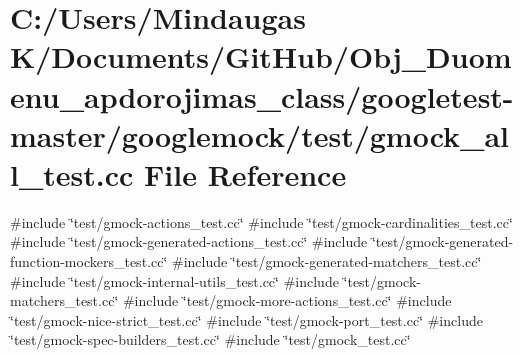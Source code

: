 \hypertarget{googletest-master_2googlemock_2test_2gmock__all__test_8cc}{}\section{C\+:/\+Users/\+Mindaugas K/\+Documents/\+Git\+Hub/\+Obj\+\_\+\+Duomenu\+\_\+apdorojimas\+\_\+class/googletest-\/master/googlemock/test/gmock\+\_\+all\+\_\+test.cc File Reference}
\label{googletest-master_2googlemock_2test_2gmock__all__test_8cc}
{\ttfamily \#include \char`\"{}test/gmock-\/actions\+\_\+test.\+cc\char`\"{}}\newline
{\ttfamily \#include \char`\"{}test/gmock-\/cardinalities\+\_\+test.\+cc\char`\"{}}\newline
{\ttfamily \#include \char`\"{}test/gmock-\/generated-\/actions\+\_\+test.\+cc\char`\"{}}\newline
{\ttfamily \#include \char`\"{}test/gmock-\/generated-\/function-\/mockers\+\_\+test.\+cc\char`\"{}}\newline
{\ttfamily \#include \char`\"{}test/gmock-\/generated-\/matchers\+\_\+test.\+cc\char`\"{}}\newline
{\ttfamily \#include \char`\"{}test/gmock-\/internal-\/utils\+\_\+test.\+cc\char`\"{}}\newline
{\ttfamily \#include \char`\"{}test/gmock-\/matchers\+\_\+test.\+cc\char`\"{}}\newline
{\ttfamily \#include \char`\"{}test/gmock-\/more-\/actions\+\_\+test.\+cc\char`\"{}}\newline
{\ttfamily \#include \char`\"{}test/gmock-\/nice-\/strict\+\_\+test.\+cc\char`\"{}}\newline
{\ttfamily \#include \char`\"{}test/gmock-\/port\+\_\+test.\+cc\char`\"{}}\newline
{\ttfamily \#include \char`\"{}test/gmock-\/spec-\/builders\+\_\+test.\+cc\char`\"{}}\newline
{\ttfamily \#include \char`\"{}test/gmock\+\_\+test.\+cc\char`\"{}}\newline
